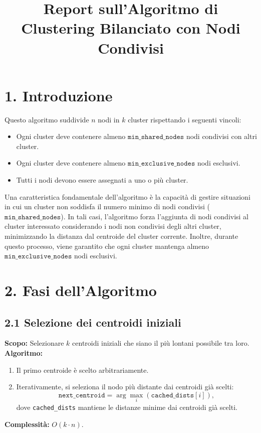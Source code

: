 \documentclass[a4paper,12pt]{article}
\begin{document}
\title{Report sull'Algoritmo di Clustering Bilanciato con Nodi Condivisi}
\author{}
\date{}
\maketitle

\section*{1. Introduzione}
Questo algoritmo suddivide \( n \) nodi in \( k \) cluster rispettando i seguenti vincoli:
\begin{itemize}
    \item Ogni cluster deve contenere almeno \( \texttt{min\_shared\_nodes} \) nodi condivisi con altri cluster.
    \item Ogni cluster deve contenere almeno \( \texttt{min\_exclusive\_nodes} \) nodi esclusivi.
    \item Tutti i nodi devono essere assegnati a uno o più cluster.
\end{itemize}

Una caratteristica fondamentale dell'algoritmo è la capacità di gestire situazioni in cui un cluster non soddisfa il numero minimo di nodi condivisi (\( \texttt{min\_shared\_nodes} \)). In tali casi, l'algoritmo forza l'aggiunta di nodi condivisi al cluster interessato considerando i nodi non condivisi degli altri cluster, minimizzando la distanza dal centroide del cluster corrente. Inoltre, durante questo processo, viene garantito che ogni cluster mantenga almeno \( \texttt{min\_exclusive\_nodes} \) nodi esclusivi.

\section*{2. Fasi dell'Algoritmo}

\subsection*{2.1 Selezione dei centroidi iniziali}
\textbf{Scopo:} Selezionare \( k \) centroidi iniziali che siano il più lontani possibile tra loro.\\
\textbf{Algoritmo:}
\begin{enumerate}
    \item Il primo centroide è scelto arbitrariamente.
    \item Iterativamente, si seleziona il nodo più distante dai centroidi già scelti:
    \[
    \texttt{next\_centroid} = \arg\max_i (\texttt{cached\_dists}[i]),
    \]
    dove \texttt{cached\_dists} mantiene le distanze minime dai centroidi già scelti.
\end{enumerate}
\textbf{Complessità:} \( O(k \cdot n) \).
\end{document}
